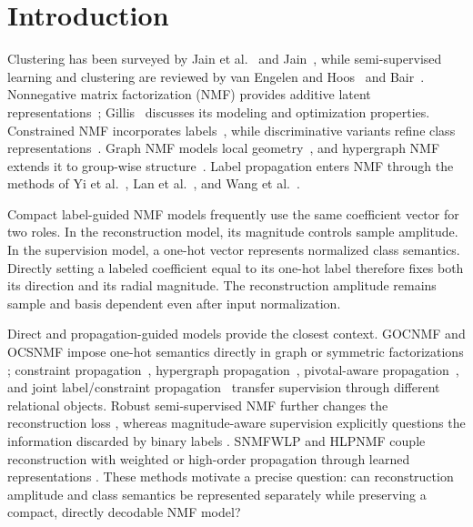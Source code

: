 \documentclass[a4paper,preprint,12pt]{elsarticle}
\theoremstyle{remark}
\begin{document}
\section{Introduction}

Clustering has been surveyed by Jain et al.~\cite{Jain1999Clustering} and Jain~\cite{Jain2010Clustering}, while semi-supervised learning and clustering are reviewed by van Engelen and Hoos~\cite{VanEngelen2020Survey} and Bair~\cite{Bair2013SSC}. Nonnegative matrix factorization (NMF) provides additive latent representations~\cite{Lee1999NMF,Lee2001Algorithms}; Gillis~\cite{Gillis2014WhyHow} discusses its modeling and optimization properties. Constrained NMF incorporates labels~\cite{Liu2012CNMF}, while discriminative variants refine class representations~\cite{Xing2021DSSNMF,Li2025EDNMF,Shen2026LCNMF}. Graph NMF models local geometry~\cite{Cai2011GNMF}, and hypergraph NMF extends it to group-wise structure~\cite{Zeng2014HypergraphNMF}. Label propagation enters NMF through the methods of Yi et al.~\cite{Yi2015LpSNMF}, Lan et al.~\cite{Lan2022LPNMF}, and Wang et al.~\cite{Wang2022PNLP}.

Compact label-guided NMF models frequently use the same coefficient vector for two roles. In the reconstruction model, its magnitude controls sample amplitude. In the supervision model, a one-hot vector represents normalized class semantics. Directly setting a labeled coefficient equal to its one-hot label therefore fixes both its direction and its radial magnitude. The reconstruction amplitude remains sample and basis dependent even after input normalization.

Direct and propagation-guided models provide the closest context. GOCNMF and OCSNMF impose one-hot semantics directly in graph or symmetric factorizations \cite{Li2025GOCNMF,Li2025OCSNMF}; constraint propagation~\cite{Wang2015ConstraintNMF}, hypergraph propagation~\cite{Yin2023HSSNMF}, pivotal-aware propagation~\cite{Yang2025SPNMF}, and joint label/constraint propagation~\cite{Mo2024PNLPSCNMF} transfer supervision through different relational objects. Robust semi-supervised NMF further changes the reconstruction loss \cite{Peng2021CSNMF}, whereas magnitude-aware supervision explicitly questions the information discarded by binary labels \cite{Jing2025SNMFSP}. SNMFWLP and HLPNMF couple reconstruction with weighted or high-order propagation through learned representations \cite{Jing2026SNMFWLP,Li2026HLPNMF}. These methods motivate a precise question: can reconstruction amplitude and class semantics be represented separately while preserving a compact, directly decodable NMF model?
\end{document}
